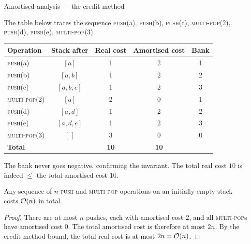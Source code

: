 \begin{intermezzo}{Amortised analysis — the credit method}
\begin{example}
  The table below traces the sequence
  \textsc{push}(a), \textsc{push}(b), \textsc{push}(c), \textsc{multi-pop}(2),
  \textsc{push}(d), \textsc{push}(e), \textsc{multi-pop}(3).

  \medskip
  \begin{center}
  \begin{tabular}{lcccc}
    \toprule
    Operation              & Stack after  & Real cost & Amortised cost & Bank \\
    \midrule
    \textsc{push}(a)       & $[a]$        & 1         & 2              & 1    \\
    \textsc{push}(b)       & $[a,b]$      & 1         & 2              & 2    \\
    \textsc{push}(c)       & $[a,b,c]$    & 1         & 2              & 3    \\
    \textsc{multi-pop}(2)  & $[a]$        & 2         & 0              & 1    \\
    \textsc{push}(d)       & $[a,d]$      & 1         & 2              & 2    \\
    \textsc{push}(e)       & $[a,d,e]$    & 1         & 2              & 3    \\
    \textsc{multi-pop}(3)  & $[\,]$       & 3         & 0              & 0    \\
    \midrule
    \textbf{Total}         &              & \textbf{10} & \textbf{10}  &      \\
    \bottomrule
  \end{tabular}
  \end{center}

  \medskip
  The bank never goes negative, confirming the invariant.
  The total real cost $10$ is indeed $\leq$ the total amortised cost $10$.
\end{example}

\begin{lemma}
  Any sequence of $n$ \textsc{push} and \textsc{multi-pop} operations on an initially
  empty stack costs $\mathcal{O}\!\left(n\right)$ in total.
\end{lemma}
\begin{proof}
  There are at most $n$ pushes, each with amortised cost $2$, and all \textsc{multi-pop}s
  have amortised cost $0$.  The total amortised cost is therefore at most $2n$.
  By the credit-method bound, the total real cost is at most $2n = \mathcal{O}\!\left(n\right)$.
\end{proof}

\end{intermezzo}

